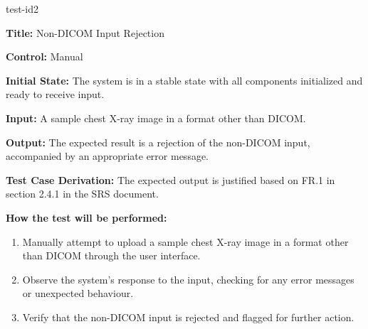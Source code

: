 \documentclass[12pt, titlepage]{article}
\begin{document}
\begin{itemize}
    \begin{item}
        test-id2
        \begin{mdframed}[linewidth=0.5mm]
            \textbf{Title:} Non-DICOM Input Rejection \par
            \textbf{Control:} Manual \par
            \textbf{Initial State:} The system is in a stable state with all components initialized and ready to receive input. \par
            \textbf{Input:} A sample chest X-ray image in a format other than DICOM. \par
            \textbf{Output:} The expected result is a rejection of the non-DICOM input, accompanied by an appropriate error message. \par
            \textbf{Test Case Derivation:} The expected output is justified based on FR.1 in section 2.4.1 in the SRS document. \par
            \textbf{How the test will be performed:}
            \begin{enumerate}[noitemsep]
                \item Manually attempt to upload a sample chest X-ray image in a format other than DICOM through the user interface.
                \item Observe the system's response to the input, checking for any error messages or unexpected behaviour.
                \item Verify that the non-DICOM input is rejected and flagged for further action.
            \end{enumerate}
        \end{mdframed}
    \end{item}


\end{itemize}
\end{document}
